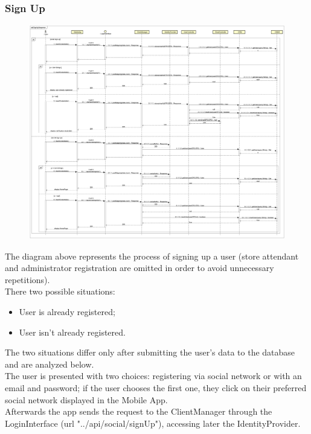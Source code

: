 \documentclass[table, 12pt]{article}
\begin{document}
\subsubsection{Sign Up}
\begin{figure}[H]
    \begin{center}
        \includegraphics[width=\textwidth]{assets/Sequence-Diagram/SignUpSequence.png}
    \end{center}
\end{figure}
The diagram above represents the process of signing up a user (store attendant and administrator  registration are omitted in order to avoid unnecessary repetitions).\\
There two possible situations:
\begin{itemize}
    \item User is already registered;
    \item User isn't already registered.
\end{itemize}
The two situations differ only after submitting the user's data to the database and are analyzed below.\\
The user is presented with two choices: registering via social network or with an email and password; if the user chooses the first one, they click on their preferred social network displayed in the Mobile App.\\
Afterwards the app sends the request to the ClientManager through the LoginInterface (url "../api/social/signUp"), accessing later the IdentityProvider.\\
\end{document}
